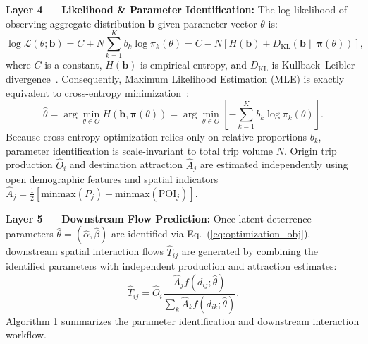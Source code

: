 \documentclass[pdflatex,sn-basic,iicol]{sn-jnl}
\begin{document}
\textbf{Layer 4 — Likelihood \& Parameter Identification:} The log-likelihood of observing aggregate distribution $\mathbf{b}$ given parameter vector $\theta$ is:
\begin{equation}\label{eq:multinomial_loglik}
\log \mathcal{L}(\theta; \mathbf{b}) = C + N \sum_{k=1}^K b_k \log \pi_k(\theta) = C - N \left[ H(\mathbf{b}) + D_{\mathrm{KL}}(\mathbf{b} \parallel \boldsymbol{\pi}(\theta)) \right],
\end{equation}
where $C$ is a constant, $H(\mathbf{b})$ is empirical entropy, and $D_{\mathrm{KL}}$ is Kullback--Leibler divergence~\citep{cover1991elements}. Consequently, Maximum Likelihood Estimation (MLE) is exactly equivalent to cross-entropy minimization~\citep{bishop2006pattern,murphy2012machine}:
\begin{equation}\label{eq:optimization_obj}
\hat{\theta} = \arg\min_{\theta \in \Theta} H(\mathbf{b}, \boldsymbol{\pi}(\theta)) = \arg\min_{\theta \in \Theta} \left[ -\sum_{k=1}^K b_k \log \pi_k(\theta) \right].
\end{equation}
Because cross-entropy optimization relies only on relative proportions $b_k$, parameter identification is scale-invariant to total trip volume $N$. Origin trip production $\hat{O}_i$ and destination attraction $\hat{A}_j$ are estimated independently using open demographic features and spatial indicators $\hat{A}_j = \frac{1}{2} [\mathrm{minmax}(P_j) + \mathrm{minmax}(\mathrm{POI}_j)]$.

\textbf{Layer 5 — Downstream Flow Prediction:} Once latent deterrence parameters $\hat{\theta} = (\hat{\alpha}, \hat{\beta})$ are identified via Eq.~(\ref{eq:optimization_obj}), downstream spatial interaction flows $\hat{T}_{ij}$ are generated by combining the identified parameters with independent production and attraction estimates:
\begin{equation}\label{eq:predicted_flow_mle}
\hat{T}_{ij} = \hat{O}_i \frac{\hat{A}_j f(d_{ij}; \hat{\theta})}{\sum_k \hat{A}_k f(d_{ik}; \hat{\theta})}.
\end{equation}
Algorithm 1 summarizes the parameter identification and downstream interaction workflow.
\end{document}
